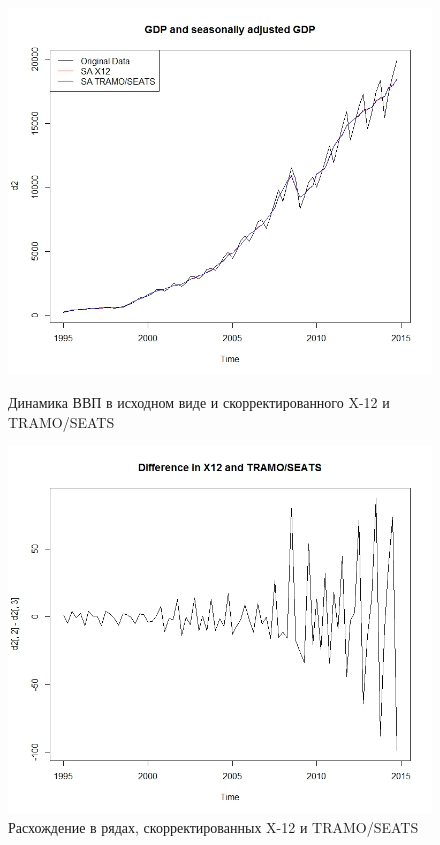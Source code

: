 \documentclass[final,pdftex]{../../template/epsilonj}\usepackage[]{graphicx}\usepackage[]{color}
\begin{document}
\begin{figure}
\centering
\begin{minipage}{.48\textwidth}
  \centering
  \includegraphics[width=\linewidth]{eps_seas1.jpg}
  \caption{Динамика ВВП в исходном виде и скорректированного X-12 и TRAMO/SEATS}
  \label{fig:test1}
\end{minipage}%
\begin{minipage}{.48\textwidth}
  \centering
  \includegraphics[width=\linewidth]{eps_seas2.jpg}
  \caption{Расхождение в рядах, скорректированных X-12 и TRAMO/SEATS}
  \label{fig:test2}
\end{minipage}
\end{figure}
\end{document}
